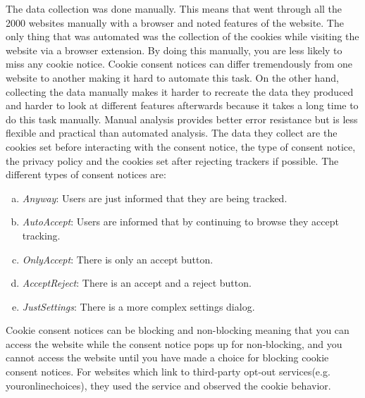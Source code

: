 The data collection was done manually. This means that \citeauthor{sanchez2019can} went through all the 2000 websites
manually with a browser and noted features of the website. The only thing that was automated was the collection of the
cookies while visiting the website via a browser extension. By doing this manually, you are less likely to miss any cookie notice.
Cookie consent notices can differ tremendously from one website to another making it hard to
automate this task. On the other hand, collecting the data manually makes it harder to recreate the data they produced
and harder to look at different features afterwards because it takes a long time to do this task manually.
Manual analysis provides better error resistance but is
less flexible and practical than automated analysis. The data they collect are the cookies set before interacting with the
consent notice, the type of consent notice, the privacy policy and the cookies set after rejecting trackers if possible.
The different types of consent notices are:
\begin{enumerate}[a)]
    \item \emph{Anyway}: Users are just informed that they are being tracked.
    \item \emph{AutoAccept}: Users are informed that by continuing to browse they accept tracking.
    \item \emph{OnlyAccept}: There is only an accept button.
    \item \emph{AcceptReject}: There is an accept and a reject button.
    \item \emph{JustSettings}: There is a more complex settings dialog.
\end{enumerate}
Cookie consent notices can be blocking and non-blocking meaning that you can access the website while the consent notice pops up for
non-blocking, and you cannot access the website until you have made a choice for blocking cookie consent notices. For
websites which link to third-party opt-out services(e.g. youronlinechoices), they used the service and observed the
cookie behavior.

